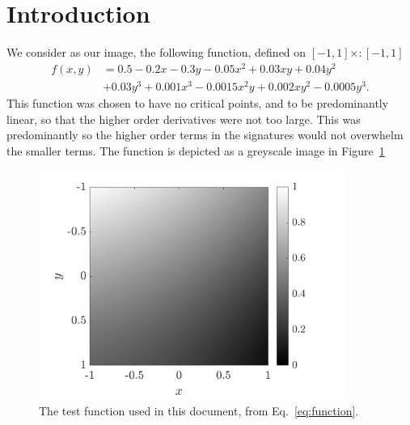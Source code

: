 \documentclass[11pt]{article}
\begin{document}
\section{Introduction}
We consider as our image, the following function, defined on $[-1, 1]
\times:
[-1, 1]$
\begin{equation}\label{eq:function}
  \begin{split}
    f(x, y) &= 0.5 - 0.2x - 0.3y - 0.05x^2 + 0.03xy + 0.04y^2 \\ 
    &+ 0.03y^3 + 0.001x^3 - 0.0015x^2y + 0.002xy^2 - 0.0005y^3.
  \end{split}
\end{equation}
This function was chosen to have no critical points, and to be
predominantly linear, so that the higher order derivatives were not too
large. This was predominantly so the higher order terms in the signatures
would not overwhelm the smaller terms. The function is depicted as a
greyscale image in Figure~\ref{fig:function}
\begin{figure}
  \centering
  \includegraphics[width=10cm]{figures/function}
  \caption{The test function used in this document, from
  Eq.~\eqref{eq:function}.}\label{fig:function}
\end{figure}
\end{document}
